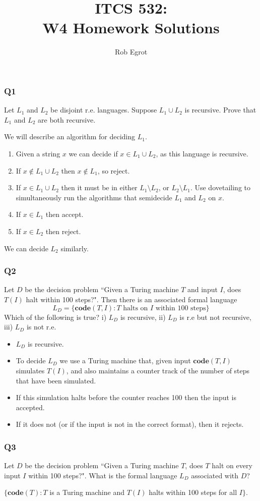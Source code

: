 \documentclass[handout]{beamer}
\title{ITCS 532:\\ W4 Homework Solutions}
\date{}
\author{Rob Egrot}
\newcommand{\co}{\mathbf{code}}
\begin{document}
\begin{frame}
\titlepage
\end{frame}

\begin{frame}
\frametitle{Q1}
Let $L_1$ and $L_2$ be disjoint r.e. languages. Suppose $L_1\cup L_2$ is recursive. Prove that $L_1$ and $L_2$ are both recursive.
\vspace{1cm}

We will describe an algorithm for deciding $L_1$. 
\begin{enumerate}
\item Given a string $x$ we can decide if $x\in L_1\cup L_2$, as this language is recursive.
\item If $x\notin L_1\cup L_2$ then $x\notin L_1$, so reject.
\item If $x\in L_1\cup L_2$ then it must be in either $L_1\setminus L_2$, or $L_2\setminus L_1$. Use dovetailing to simultaneously run the algorithms that semidecide $L_1$ and $L_2$ on $x$.
\item If $x\in L_1$ then accept.
\item If $x\in L_2$ then reject.
\end{enumerate}
We can decide $L_2$ similarly.
\end{frame}

\begin{frame}
\frametitle{Q2}
Let $D$ be the decision problem ``Given a Turing machine $T$ and input $I$, does $T(I)$ halt within 100 steps?". Then there is an associated formal language \[L_D=\{\co(T,I):T \text{ halts on } I \text{ within 100 steps}\}\]
Which of the following is true?
i) $L_D$ is recursive, ii) $L_D$ is r.e but not recursive, iii) $L_D$ is not r.e.
\vspace{0.2cm}
\begin{itemize}
\item $L_D$ is recursive. 
\item To decide $L_D$ we use a Turing machine that, given input $\co(T,I)$ simulates $T(I)$, and also maintains a counter track of the number of steps that have been simulated. 
\item If this simulation halts before the counter reaches 100 then the input is accepted. 
\item If it does not (or if the input is not in the correct format), then it rejects.
\end{itemize}
\end{frame}

\begin{frame}
\frametitle{Q3}
Let $D$ be the decision problem ``Given a Turing machine $T$, does $T$ halt on every input $I$ within 100 steps?". What is the formal language $L_D$ associated with $D$?

\vspace{1cm}
$\{\co(T): T$ is a Turing machine and $T(I)$ halts within 100 steps for all $I\}$.
\end{frame}
\end{document}
